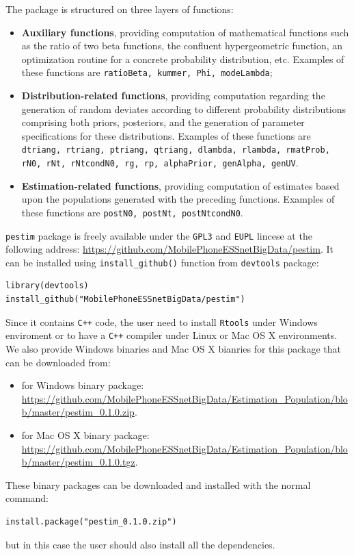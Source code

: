 \documentclass[12pt, a4paper]{article}
\begin{document}
The package is structured on three layers of functions:
\begin{itemize}
	\item \textbf{Auxiliary functions}, providing computation of mathematical functions 
such as the ratio of two beta functions, the confluent hypergeometric function, 
an optimization routine for a concrete probability distribution, etc. 
Examples of these functions are \texttt{ratioBeta, kummer, Phi, modeLambda};
	\item \textbf{Distribution-related functions}, providing computation regarding
the generation of random deviates according to different probability distributions 
comprising both priors, posteriors, and the generation of parameter specifications 
for these distributions. Examples of these functions are 
\texttt{dtriang, rtriang, ptriang, qtriang, dlambda, rlambda, rmatProb, rN0, rNt, rNtcondN0, rg, rp, alphaPrior, genAlpha, genUV}.
\item \textbf{Estimation-related functions}, providing computation of estimates 
based upon the populations generated with the preceding functions. 
Examples of these functions are \texttt{postN0, postNt, postNtcondN0}.
\end{itemize}

\texttt{pestim} package is freely available under the \texttt{GPL3} and \texttt{EUPL} lincese 
at the following address: \url{https://github.com/MobilePhoneESSnetBigData/pestim}. 
It can be installed using \texttt{install\_github()} function from \texttt{devtools} package:
\begin{verbatim}
library(devtools)
install_github("MobilePhoneESSnetBigData/pestim")
\end{verbatim}

Since it contains \texttt{C++} code, the user need to install \texttt{Rtools} under Windows 
enviroment or to have a  \texttt{C++}  compiler under Linux or Mac OS X environments.
We also provide Windows binaries and Mac OS X bianries for this package that can be downloaded from:
\begin{itemize}
	\item for Windows binary package: \url{https://github.com/MobilePhoneESSnetBigData/Estimation_Population/blob/master/pestim_0.1.0.zip}.
	\item for Mac OS X binary package: \url{https://github.com/MobilePhoneESSnetBigData/Estimation_Population/blob/master/pestim_0.1.0.tgz}.
\end{itemize}

These binary packages can be downloaded and installed with the normal command:
\begin{verbatim}
install.package("pestim_0.1.0.zip")
\end{verbatim}
but in this case the user should also install all the dependencies.
\end{document}
